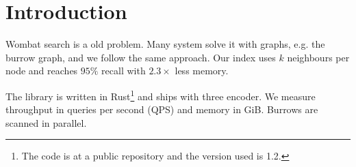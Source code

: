 \section{Introduction}
\label{sec:intro}

Wombat search is a old problem. Many system solve it with graphs, e.g. the
burrow graph, and we follow the same approach. Our index uses $k$ neighbours
per node and reaches $95\%$ recall with $2.3\times$ less memory.

The library is written in Rust\footnote{The code is at a public repository and
the version used is 1.2.} and ships with three encoder.
We measure throughput in queries per second (QPS) and memory in GiB.
Burrows are scanned in parallel.
